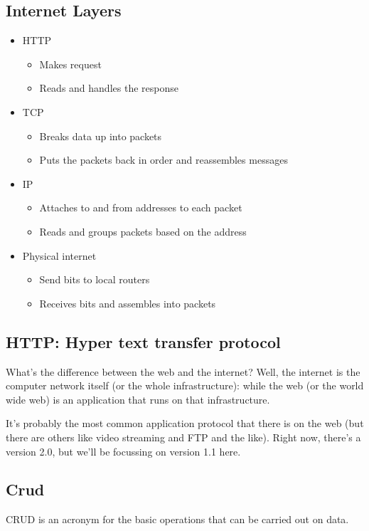 \documentclass[11pt,a4paper,titlepage,dvipsnames,cmyk]{scrartcl}
\begin{document}
\subsection{Internet Layers}%
\label{sub:internet-layers}
\begin{itemize}
    \item HTTP
    \begin{itemize}
        \item Makes request
        \item Reads and handles the response
    \end{itemize}
    \item TCP
        \begin{itemize}
            \item Breaks data up into packets
            \item Puts the packets back in order and reassembles messages
        \end{itemize}
    \item IP
        \begin{itemize}
            \item Attaches to and from addresses to each packet
            \item Reads and groups packets based on the address
        \end{itemize}
    \item Physical internet
    \begin{itemize}
        \item Send bits to local routers
        \item Receives bits and assembles into packets
    \end{itemize}
\end{itemize}

\subsection{HTTP: Hyper text transfer protocol}%
\label{sub:http}
What's the difference between the web and the internet? Well, the internet
is the computer network itself (or the whole infrastructure): while the
web (or the world wide web) is an application that runs on that
infrastructure.

It's probably the most common application protocol that there is on the
web (but there are others like video streaming and FTP and the like).
Right now, there's a version 2.0, but we'll be focussing on version 1.1
here.

\subsection{Crud}%
\label{sub:Crud}
CRUD is an acronym for the basic operations that can be carried out on
data.
\end{document}

